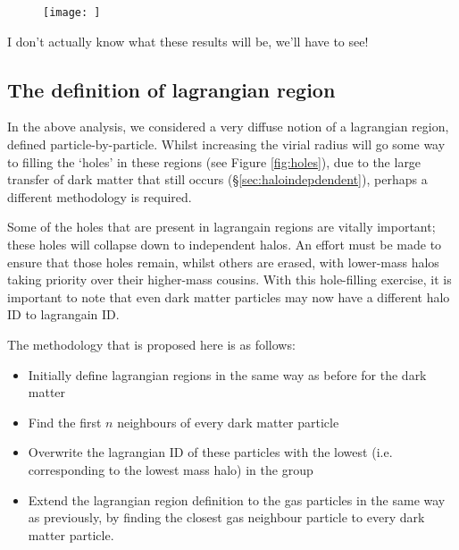 \begin{figure}
    \centering
    \texttt{[image: ]}
    \caption{}
    \label{fig:comparevirialradii}
\end{figure}

I don't actually know what these results will be, we'll have to see!

\subsection{The definition of lagrangian region}

In the above analysis, we considered a very diffuse notion of a lagrangian
region, defined particle-by-particle. Whilst increasing the virial radius
will go some way to filling the `holes' in these regions (see Figure
\ref{fig:holes}), due to the large transfer of dark matter that still occurs
(\S \ref{sec:haloindepdendent}), perhaps a different methodology is required.

Some of the holes that are present in lagrangain regions are vitally important;
these holes will collapse down to independent halos. An effort must be made
to ensure that those holes remain, whilst others are erased, with lower-mass
halos taking priority over their higher-mass cousins. With this hole-filling
exercise, it is important to note that even dark matter particles may now
have a different halo ID to lagrangain ID.

The methodology that is proposed here is as follows:
\begin{itemize}
    \item Initially define lagrangian regions in the same way as before for
          the dark matter
    \item Find the first $n$ neighbours of every dark matter particle
    \item Overwrite the lagrangian ID of these particles with the lowest (i.e.
          corresponding to the lowest mass halo) in the group
    \item Extend the lagrangian region definition to the gas particles in
          the same way as previously, by finding the closest gas neighbour
	  particle to every dark matter particle.
\end{itemize}


